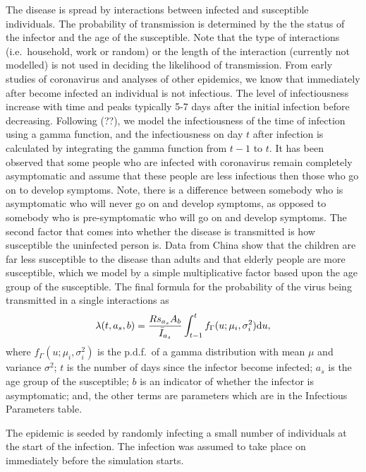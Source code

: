 \documentclass[11pt, oneside]{amsart}   	%
\begin{document}
The disease is spread by interactions between infected and susceptible individuals.
The probability of transmission is determined by the the status of the infector and the age of the susceptible.
Note that the type of interactions (i.e.\ household, work or random) or the length of the interaction (currently not modelled) is not used in deciding the likelihood of transmission.
From early studies of coronavirus and analyses of other epidemics, we know that immediately after become infected an individual is not infectious.
The level of infectiousness increase with time and peaks typically 5-7 days after the initial infection before decreasing.
Following (??), we model the infectiousness of the time of infection using a gamma function, and the infectiousness on day $t$ after infection is calculated by integrating the gamma function from $t-1$ to $t$.
It has been observed that some people who are infected with coronavirus remain completely asymptomatic and assume that these people are less infectious then those who go on to develop symptoms.
Note, there is a difference between somebody who is asymptomatic who will never go on and develop symptoms, as opposed to somebody who is pre-symptomatic who will go on and develop symptoms.
The second factor that comes into whether the disease is transmitted is how susceptible the uninfected person is. 
Data from China show that the children are far less susceptible to the disease than adults and that elderly people are more susceptible, which we model by a simple multiplicative factor based upon the age group of the susceptible.
The final formula for the probability of the virus being transmitted in a single interactions as
\begin{equation}
\lambda(t,a_s,b) = \frac{R s_{a_s}A_b}{ \bar I_{a_s}} \int_{t-1}^t f_{\Gamma}(u; \mu_i,\sigma_i^2) {\rm d}u,
\end{equation}
where $f_{\Gamma}(u; \mu_i,\sigma_i^2)$ is the p.d.f.\ of a gamma distribution with mean $\mu$ and variance $\sigma^2$; $t$ is the number of days since the infector become infected; $a_s$ is the age group of the susceptible; $b$ is an indicator of whether the infector is asymptomatic; and, the other terms are parameters which are in the Infectious Parameters table.

The epidemic is seeded by randomly infecting a small number of individuals at the start of the infection. 
The infection was assumed to take place on immediately before the simulation starts.
\end{document}
